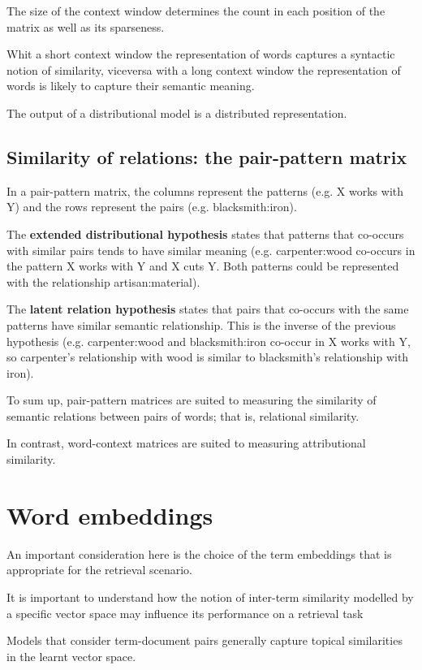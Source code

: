 The size of the context window determines the count in each position of the matrix as well as its sparseness.

Whit a short context window the representation of words captures a syntactic notion of similarity, viceversa with a long context window the representation of words is likely to capture their semantic meaning.

The output of a distributional model is a distributed representation.

\subsection{Similarity of relations: the pair-pattern matrix}

In a pair-pattern matrix, the columns represent the patterns (e.g. X works with
Y) and the rows represent the pairs (e.g. blacksmith:iron).

The \textbf{extended distributional hypothesis} states that patterns that
co-occurs with similar pairs tends to have similar meaning (e.g.
carpenter:wood co-occurs in the pattern X works with Y and X cuts Y. Both
patterns could be represented with the relationship artisan:material).

The \textbf{latent relation hypothesis} states that pairs that co-occurs with
the same patterns have similar semantic relationship. This is the inverse of the
previous hypothesis (e.g. carpenter:wood and blacksmith:iron co-occur in
X works with Y, so carpenter's relationship with wood is similar to
blacksmith's relationship with iron).

To sum up, pair-pattern matrices are suited to measuring the similarity of
semantic relations between pairs of words; that is, relational similarity.

In contrast, word-context matrices are suited to measuring attributional
similarity.

\section{Word embeddings}

An important consideration here is the choice of the term embeddings that is appropriate for the retrieval scenario.

It is important to understand how the notion of inter-term similarity modelled by a specific vector space may influence its performance on a retrieval task

Models that consider term-document pairs generally capture topical similarities in the learnt vector space.

